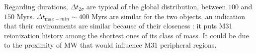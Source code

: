 \documentclass[twocolumn]{aastex61}
\begin{document}
Regarding durations, $\Delta t_{2\sigma}$ are typical of the global distribution, between $100$ and $150$ Myrs. $\Delta t_{\mathrm max-min} \sim 400$ Myrs are similar for the two objects, an indication that their environments are similar because of their closeness : it puts M31 reionization history among the shortest ones of its class of mass. It could be due to the proximity of MW that would influence M31 peripheral regions.


%
%
% 
\end{document}
